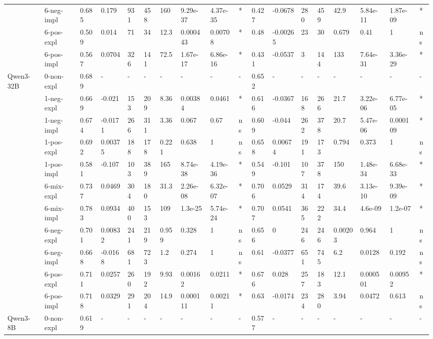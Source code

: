 \begin{table}[hp]
{\begin{adjustbox}{max width=\textwidth}
\begin{tabular}{ll|llllllll|llllllll}
 & 6-neg-impl & 0.685 & 0.179 & 931 & 458 & 160 & 9.29e-37 & 4.37e-35 & * & 0.427 & -0.0678 & 280 & 459 & 42.9 & 5.84e-11 & 1.87e-09 & * \\
 & 6-pos-expl & 0.509 & 0.014 & 71 & 34 & 12.3 & 0.000443 & 0.00708 & * & 0.48 & -0.00265 & 23 & 30 & 0.679 & 0.41 & 1 & ns \\
 & 6-pos-impl & 0.567 & 0.0704 & 326 & 141 & 72.5 & 1.67e-17 & 6.86e-16 & * & 0.431 & -0.0537 & 3 & 144 & 133 & 7.64e-31 & 3.36e-29 & * \\
\midrule
\multirow[t]{11}{*}{Qwen3-32B} & 0-non-expl & 0.689 & - & - & - & - & - & - & - & 0.652 & - & - & - & - & - & - & - \\
 & 1-neg-expl & 0.669 & -0.021 & 153 & 209 & 8.36 & 0.00384 & 0.0461 & * & 0.616 & -0.0367 & 168 & 266 & 21.7 & 3.22e-06 & 6.77e-05 & * \\
 & 1-neg-impl & 0.674 & -0.0171 & 266 & 311 & 3.36 & 0.067 & 0.67 & ns & 0.609 & -0.044 & 262 & 378 & 20.7 & 5.47e-06 & 0.000109 & * \\
 & 1-pos-expl & 0.692 & 0.00375 & 188 & 178 & 0.221 & 0.638 & 1 & ns & 0.658 & 0.00674 & 191 & 173 & 0.794 & 0.373 & 1 & ns \\
 & 1-pos-impl & 0.581 & -0.107 & 103 & 389 & 165 & 8.74e-38 & 4.19e-36 & * & 0.549 & -0.101 & 107 & 378 & 150 & 1.48e-34 & 6.68e-33 & * \\
 & 6-mix-expl & 0.737 & 0.0469 & 304 & 180 & 31.3 & 2.26e-08 & 6.32e-07 & * & 0.706 & 0.0529 & 314 & 174 & 39.6 & 3.13e-10 & 9.39e-09 & * \\
 & 6-mix-impl & 0.783 & 0.0934 & 400 & 153 & 109 & 1.3e-25 & 5.74e-24 & * & 0.707 & 0.0541 & 365 & 222 & 34.4 & 4.6e-09 & 1.2e-07 & * \\
 & 6-neg-expl & 0.701 & 0.00832 & 241 & 219 & 0.959 & 0.328 & 1 & ns & 0.656 & 0 & 246 & 246 & 0.00203 & 0.964 & 1 & ns \\
 & 6-neg-impl & 0.668 & -0.0168 & 681 & 723 & 1.2 & 0.274 & 1 & ns & 0.61 & -0.0377 & 651 & 745 & 6.2 & 0.0128 & 0.192 & ns \\
 & 6-pos-expl & 0.711 & 0.0257 & 260 & 192 & 9.93 & 0.00162 & 0.0211 & * & 0.676 & 0.028 & 257 & 183 & 12.1 & 0.000501 & 0.00952 & * \\
 & 6-pos-impl & 0.718 & 0.0329 & 291 & 204 & 14.9 & 0.000111 & 0.00211 & * & 0.63 & -0.0174 & 234 & 280 & 3.94 & 0.0472 & 0.613 & ns \\
\midrule
\multirow[t]{11}{*}{Qwen3-8B} & 0-non-expl & 0.619 & - & - & - & - & - & - & - & 0.577 & - & - & - & - & - & - & - \\

\end{tabular}
\end{adjustbox}}
\end{table}
